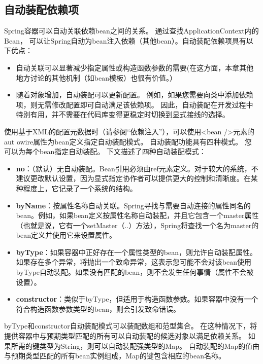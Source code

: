 \subsection{自动装配依赖项}
Spring容器可以自动关联依赖bean之间的关系。
通过查找ApplicationContext内的Bean，
可以让Spring自动为bean注入依赖（其他bean）。自动装配依赖项具有以下优点：


\begin{itemize}
    \item 自动关联可以显著减少指定属性或构造函数参数的需要(在这方面，本章其他地方讨论的其他机制（如bean模板）也很有价值。）
    \item 随着对象增加，自动装配可以更新配置。
     例如，如果您需要向类中添加依赖项，则无需修改配置即可自动满足该依赖项。 
     因此，自动装配在开发过程中特别有用，并不需要在代码库变得更稳定时切换到显式接线的选择。
\end{itemize}

使用基于XML的配置元数据时（请参阅“依赖注入”），可以使用<bean />元素的aut
owire属性为bean定义指定自动装配模式。 自动装配功能具有四种模式。 您
可以为每个bean指定自动装配。 下文描述了四种自动装配模式：

\begin{itemize}
    \item \textbf{no}：（默认）无自动装配。Bean引用必须由ref元素定义。对于较大的系统，不建议更改默认设置，因为显式指定协作者可以提供更大的控制和清晰度。在某种程度上，它记录了一个系统的结构。
    \item \textbf{byName}：按属性名称自动关联。Spring寻找与需要自动连接的属性同名的bean。例如，如果bean定义按属性名称自动装配，并且它包含一个master属性（也就是说，它有一个setMaster（..）方法），Spring将查找一个名为master的bean定义并使用它来设置属性。
    \item \textbf{byType}：如果容器中正好存在一个属性类型的bean，则允许自动装配属性。如果存在多个异常，将抛出一个致命异常，这表示您可能不会对该bean使用byType自动装配。如果没有匹配的bean，则不会发生任何事情（属性不会被设置）。
    \item \textbf{constructor}：类似于byType，但适用于构造函数参数。如果容器中没有一个符合构造函数参数类型的bean，则会引发致命错误。
\end{itemize}

byType和constructor自动装配模式可以装配数组和范型集合。
在这种情况下，将提供容器中与预期类型匹配的所有可以自动装配的候选对象以满足依赖关系。
如果所需的键类型为String，则可以自动装配强类型的Map。
自动装配的Map的值由与预期类型匹配的所有bean实例组成，Map的键包含相应的bean名称。

